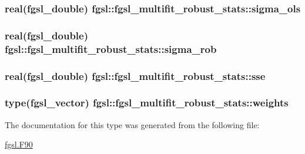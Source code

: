 \hypertarget{structfgsl_1_1fgsl__multifit__robust__stats_adf176fab65c7036d151f74de617d219a}{
\subsubsection[{sigma\-\_\-ols}]{\setlength{\rightskip}{0pt plus 5cm}real({\bf fgsl\-\_\-double}) fgsl\-::fgsl\-\_\-multifit\-\_\-robust\-\_\-stats\-::sigma\-\_\-ols}}\label{structfgsl_1_1fgsl__multifit__robust__stats_adf176fab65c7036d151f74de617d219a}
\hypertarget{structfgsl_1_1fgsl__multifit__robust__stats_a5584eeb03f4001749227079089275075}{
\subsubsection[{sigma\-\_\-rob}]{\setlength{\rightskip}{0pt plus 5cm}real({\bf fgsl\-\_\-double}) fgsl\-::fgsl\-\_\-multifit\-\_\-robust\-\_\-stats\-::sigma\-\_\-rob}}\label{structfgsl_1_1fgsl__multifit__robust__stats_a5584eeb03f4001749227079089275075}
\hypertarget{structfgsl_1_1fgsl__multifit__robust__stats_a137f634721561413a40c1269d954a504}{
\subsubsection[{sse}]{\setlength{\rightskip}{0pt plus 5cm}real({\bf fgsl\-\_\-double}) fgsl\-::fgsl\-\_\-multifit\-\_\-robust\-\_\-stats\-::sse}}\label{structfgsl_1_1fgsl__multifit__robust__stats_a137f634721561413a40c1269d954a504}
\hypertarget{structfgsl_1_1fgsl__multifit__robust__stats_a767002a21069053a5a5c8143a1903814}{
\subsubsection[{weights}]{\setlength{\rightskip}{0pt plus 5cm}type({\bf fgsl\-\_\-vector}) fgsl\-::fgsl\-\_\-multifit\-\_\-robust\-\_\-stats\-::weights}}\label{structfgsl_1_1fgsl__multifit__robust__stats_a767002a21069053a5a5c8143a1903814}


The documentation for this type was generated from the following file\-:\begin{DoxyCompactItemize}
\item 
\hyperlink{fgsl_8F90}{fgsl.\-F90}\end{DoxyCompactItemize}
